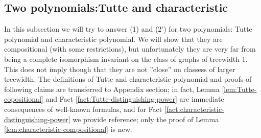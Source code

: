 \subsection{Two polynomials:Tutte and characteristic}
In this subsection we will try to answer (1) and (2') for two polynomials: Tutte polynomial and characteristic polynomial. We will show that they are compositional (with some restrictions), but unfortunately they are very far from being a complete isomorphism invariant on the class of graphs of treewidth 1. This does not imply though that they are not ''close'' on classess of larger treewidth. The definitions of Tutte and characteristic polynomial and proofs of following claims are transferred to Appendix section; in fact, Lemma \ref{lem:Tutte-copositional} and Fact \ref{fact:Tutte-distinguishing-power} are immediate consequences of well-known formulas, and for Fact \ref{fact:characteristic-distinguishing-power} we provide reference; only the proof of Lemma \ref{lem:characteristic-compositional} is new.

